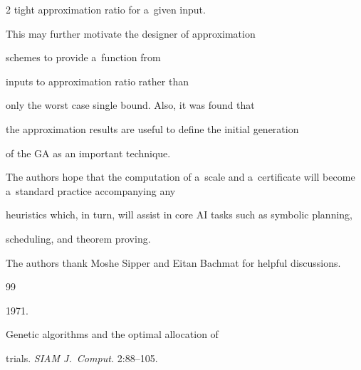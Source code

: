 \begin{multicols}{2}
tight approximation ratio for a~given input.


This may further motivate the designer of approximation


schemes to provide a~function from


inputs to approximation ratio rather than


only the worst case single bound. Also, it was found that


the approximation results are useful to define the initial generation


of the GA as an important technique.





The authors hope that the computation of a~scale and a~certificate will become a~standard practice accompanying any


heuristics which, in turn, will assist in core AI tasks such as symbolic planning,


scheduling, and theorem proving.










\Ack


\noindent


The authors thank Moshe Sipper and Eitan Bachmat for helpful discussions.





\renewcommand{\bibname}{\protect\rmfamily References}










{\small\frenchspacing


{%


\begin{thebibliography}{99}







 1971.


Genetic algorithms and the optimal allocation of


trials. \textit{SIAM J.~Comput.} 2:88--105.









\end{thebibliography}}}
\end{multicols}
